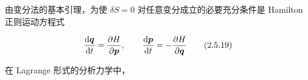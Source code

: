 由变分法的基本引理，为使 $\delta S = 0$ 对任意变分成立的必要充分条件是
Hamilton 正则运动方程式

\begin{equation}
  \frac{\mathrm{d}\bm{q}}{\mathrm{d} t} = \frac{\partial H}{\partial\bm{p}},\qquad
  \frac{\mathrm{d}\bm{p}}{\mathrm{d} t} = -\frac{\partial H}{\partial\bm{q}}
  \tag{2.5.19}
\end{equation}

在 Lagrange 形式的分析力学中，
